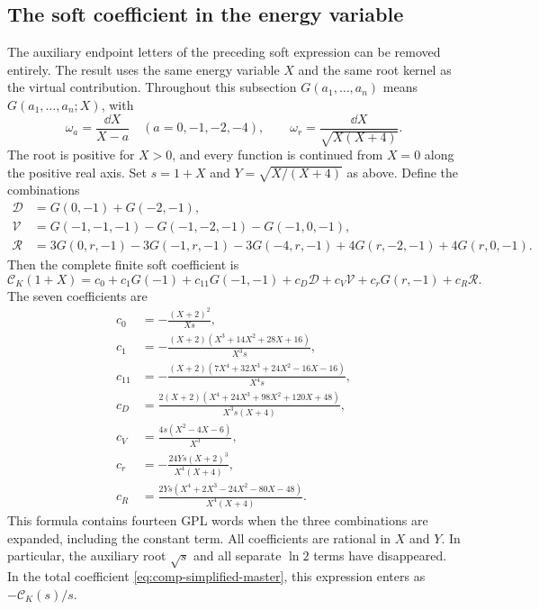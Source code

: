 \subsection{The soft coefficient in the energy variable}
\label{sec:comp-ck-energy-formula}
The auxiliary endpoint letters of the preceding soft expression can be
removed entirely. The result uses the same energy variable $X$ and the
same root kernel as the virtual contribution. Throughout this subsection
$G(a_1,\ldots,a_n)$ means $G(a_1,\ldots,a_n;X)$, with
\begin{equation}
 \omega_a=\frac{\dd X}{X-a}\quad(a=0,-1,-2,-4),\qquad
 \omega_r=\frac{\dd X}{\sqrt{X(X+4)}}.
\end{equation}
The root is positive for $X>0$, and every function is continued from
$X=0$ along the positive real axis. Set $s=1+X$ and
$Y=\sqrt{X/(X+4)}$ as above. Define the combinations
\begin{align}
 \mathcal D&=G(0,-1)+G(-2,-1),\\
 \mathcal V&=G(-1,-1,-1)-G(-1,-2,-1)-G(-1,0,-1),\\
 \mathcal R&=3G(0,r,-1)-3G(-1,r,-1)-3G(-4,r,-1)
              +4G(r,-2,-1)+4G(r,0,-1).
\end{align}
Then the complete finite soft coefficient is
\begin{equation}
 \boxed{\mathcal C_K(1+X)=c_0+c_1G(-1)+c_{11}G(-1,-1)
           +c_D\mathcal D+c_V\mathcal V+c_rG(r,-1)+c_R\mathcal R.}
 \label{eq:comp-ck-energy-compact}
\end{equation}
The seven coefficients are
\begin{align}
 c_0&=-\frac{(X+2)^2}{Xs},\\
 c_1&=-\frac{(X+2)(X^3+14X^2+28X+16)}{X^3s},\\
 c_{11}&=-\frac{(X+2)(7X^4+32X^3+24X^2-16X-16)}{X^4s},\\
 c_D&=\frac{2(X+2)(X^4+24X^3+98X^2+120X+48)}{X^3s(X+4)},\\
 c_V&=\frac{4s(X^2-4X-6)}{X^3},\\
 c_r&=-\frac{24Ys(X+2)^3}{X^4(X+4)},\\
 c_R&=\frac{2Ys(X^4+2X^3-24X^2-80X-48)}{X^4(X+4)}.
\end{align}
This formula contains fourteen GPL words when the three combinations
are expanded, including the constant term. All coefficients are
rational in $X$ and $Y$. In particular, the auxiliary root $\sqrt s$
and all separate $\ln2$ terms have disappeared. In the total coefficient
\eqref{eq:comp-simplified-master}, this expression enters as
$-\mathcal C_K(s)/s$.

